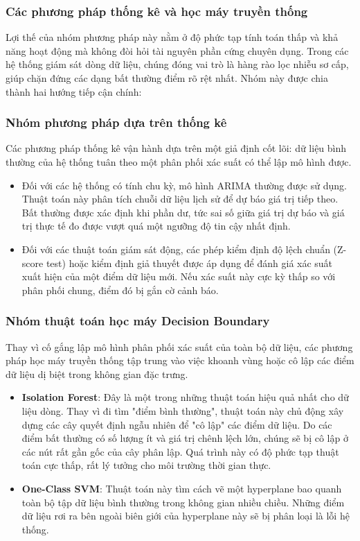 \subsubsection{Các phương pháp thống kê và học máy truyền thống}
Lợi thế của nhóm phương pháp này nằm ở độ phức tạp tính toán thấp và khả năng hoạt động mà không đòi hỏi tài nguyên phần cứng chuyên dụng. Trong các hệ thống giám sát dòng dữ liệu, chúng đóng vai trò là hàng rào lọc nhiễu sơ cấp, giúp chặn đứng các dạng bất thường điểm rõ rệt nhất. Nhóm này được chia thành hai hướng tiếp cận chính:
\subsubsection*{Nhóm phương pháp dựa trên thống kê}
Các phương pháp thống kê vận hành dựa trên một giả định cốt lõi: dữ liệu bình thường của hệ thống tuân theo một phân phối xác suất có thể lập mô hình được.
\begin{itemize}[label=--]
    \item Đối với các hệ thống có tính chu kỳ, mô hình ARIMA thường được sử dụng. Thuật toán này phân tích chuỗi dữ liệu lịch sử để dự báo giá trị tiếp theo. Bất thường được xác định khi phần dư, tức sai số giữa giá trị dự báo và giá trị thực tế đo được vượt quá một ngưỡng độ tin cậy nhất định.
    \item Đối với các thuật toán giám sát động, các phép kiểm định độ lệch chuẩn (Z-score test) hoặc kiểm định giả thuyết được áp dụng để đánh giá xác suất xuất hiện của một điểm dữ liệu mới. Nếu xác suất này cực kỳ thấp so với phân phối chung, điểm đó bị gắn cờ cảnh báo.
\end{itemize}
\subsubsection*{Nhóm thuật toán học máy Decision Boundary}
Thay vì cố gắng lập mô hình phân phối xác suất của toàn bộ dữ liệu, các phương pháp học máy truyền thống tập trung vào việc khoanh vùng hoặc cô lập các điểm dữ liệu dị biệt trong không gian đặc trưng.
\begin{itemize}[label=--]
    \item \textbf{Isolation Forest}: Đây là một trong những thuật toán hiệu quả nhất cho dữ liệu dòng. Thay vì đi tìm "điểm bình thường", thuật toán này chủ động xây dựng các cây quyết định ngẫu nhiên để "cô lập" các điểm dữ liệu. Do các điểm bất thường có số lượng ít và giá trị chênh lệch lớn, chúng sẽ bị cô lập ở các nút rất gần gốc của cây phân lập. Quá trình này có độ phức tạp thuật toán cực thấp, rất lý tưởng cho môi trường thời gian thực.
    \item \textbf{One-Class SVM}: Thuật toán này tìm cách vẽ một hyperplane bao quanh toàn bộ tập dữ liệu bình thường trong không gian nhiều chiều. Những điểm dữ liệu rơi ra bên ngoài biên giới của hyperplane này sẽ bị phân loại là lỗi hệ thống.
\end{itemize}

